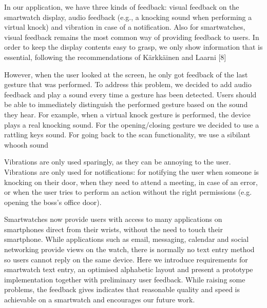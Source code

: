 \documentclass{article}
\begin{document}
In our application, we have three kinds of feedback:
visual feedback on the smartwatch display, audio
feedback (e.g., a knocking sound when performing a
virtual knock) and vibration in case of a notification.
Also for smartwatches, visual feedback remains the
most common way of providing feedback to users. In
order to keep the display contents easy to grasp, we
only show information that is essential, following the
recommendations of Kärkkäinen and Laarni [8]

 However, when the user looked
at the screen, he only got feedback of the last gesture
that was performed. To address this problem, we
decided to add audio feedback and play a sound every
time a gesture has been detected. Users should be able
to immediately distinguish the performed gesture based
on the sound they hear. For example, when a virtual
knock gesture is performed, the device plays a real
knocking sound. For the opening/closing gesture we
decided to use a rattling keys sound. For going back to
the scan functionality, we use a sibilant whoosh sound

 Vibrations are only used
sparingly, as they can be annoying to the user.
Vibrations are only used for notifications: for notifying
the user when someone is knocking on their door, when
they need to attend a meeting, in case of an error, or
when the user tries to perform an action without the
right permissions (e.g. opening the boss’s office door). 

Smartwatches now provide users with access to many
applications on smartphones direct from their wrists,
without the need to touch their smartphone. While
applications such as email, messaging, calendar and
social networking provide views on the watch, there is
normally no text entry method so users cannot reply on
the same device. Here we introduce requirements for
smartwatch text entry, an optimised alphabetic layout
and present a prototype implementation together with
preliminary user feedback. While raising some problems,
the feedback gives indicates that reasonable quality and
speed is achievable on a smartwatch and encourages our
future work.
\end{document}
